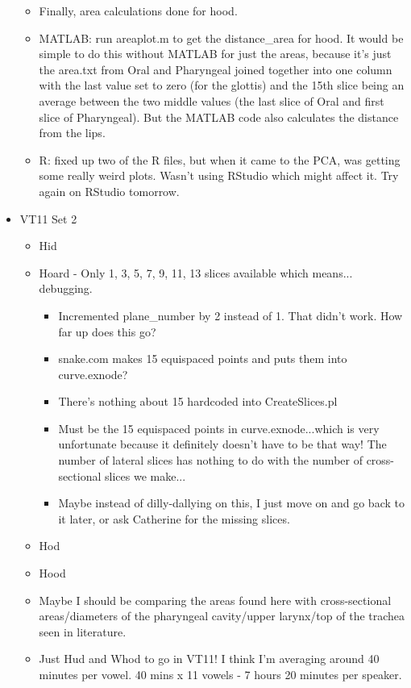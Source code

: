 \documentclass{article}
\begin{document}
\begin{itemize}
\begin{itemize}
        \item Finally, area calculations done for hood.
        \item MATLAB: run areaplot.m to get the distance_area for hood. It would be simple to do this without MATLAB for just the areas, because it's just the area.txt from Oral and Pharyngeal joined together into one column with the last value set to zero (for the glottis) and the 15th slice being an average between the two middle values (the last slice of Oral and first slice of Pharyngeal). But the MATLAB code also calculates the distance from the lips.
        \item R: fixed up two of the R files, but when it came to the PCA, was getting some really weird plots. Wasn't using RStudio which might affect it. Try again on RStudio tomorrow.
    \end{itemize}
    \item VT11 Set 2
    \begin{itemize}
        \item Hid
        \item Hoard - Only 1, 3, 5, 7, 9, 11, 13 slices available which means... debugging.
        \begin{itemize}
            \item Incremented plane\_number by 2 instead of 1. That didn't work. How far up does this go?
            \item snake.com makes 15 equispaced points and puts them into curve.exnode?
            \item There's nothing about 15 hardcoded into CreateSlices.pl
            \item Must be the 15 equispaced points in curve.exnode...which is very unfortunate because it definitely doesn't have to be that way! The number of lateral slices has nothing to do with the number of cross-sectional slices we make...
            \item Maybe instead of dilly-dallying on this, I just move on and go back to it later, or ask Catherine for the missing slices.
        \end{itemize}
        \item Hod
        \item Hood
        \item Maybe I should be comparing the areas found here with cross-sectional areas/diameters of the pharyngeal cavity/upper larynx/top of the trachea seen in literature.
        \item Just Hud and Whod to go in VT11! I think I'm averaging around 40 minutes per vowel. 40 mins x 11 vowels - 7 hours 20 minutes per speaker.
    \end{itemize}
\end{itemize}
\end{document}
